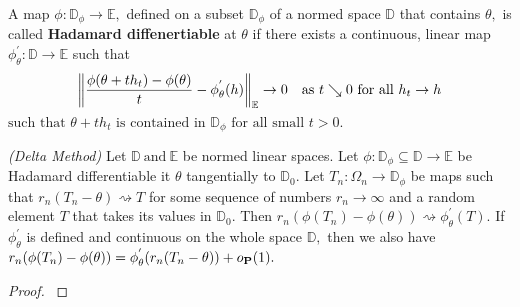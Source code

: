 \begin{definition}
  A map 
  $
  \phi:
  \mathbb{D}_\phi
  \to 
  \mathbb{E}
  ,
  $
  defined on a subset 
  $
  \mathbb{D}_\phi
  $
  of a normed space
  $\mathbb{D}$
  that contains 
  $\theta,$
  is called 
  \textbf{Hadamard diffenertiable}
  at $\theta$
  if there exists a continuous,
  linear map
  $
  \phi_\theta^{'}
    :
    \mathbb{D}
    \to 
    \mathbb{E}
  $
  such that
  \begin{gather}
    \norm{
      \frac{
        \phi(\theta + t h_t)
        -
        \phi(\theta)
      }{
        t
      }
      -
      \phi^{'}_\theta
      (h)
    }_\mathbb{E}
    \to
    0
    \quad
    \text{as}
    \ 
    t\searrow 0
    \ 
    \text{for all}
    \ 
    h_t \to h
  \end{gather}
  $
    \text{such that $\theta + th_t$ is contained in $\mathbb{D}_\phi$ for all small $t>0.$}
  $
\end{definition}


\begin{ftheorem}
  \emph{(Delta Method)}
  Let 
  $
    \mathbb{D}
    \ \text{and}
    \ 
    \mathbb{E}
  $
  be normed linear spaces.
  Let
  $
    \phi
    :
    \mathbb{D}_\phi
    \subseteq
    \mathbb{D}
    \to
    \mathbb{E}
  $
  be Hadamard differentiable it $\theta$
  tangentially to 
  $\mathbb{D}_0.$
  Let
  $
    T_n
    :
    \Omega_n
    \to
    \mathbb{D}_\phi
  $
  be maps such that 
  $
    r_n
    (T_n - \theta)
    \rightsquigarrow
    T
  $
  for some sequence of numbers $r_n \to \infty$
  and a random element $T$
  that takes its values in $\mathbb{D}_0.$
  Then 
  $
    r_n(\phi(T_n)-\phi(\theta))
    \rightsquigarrow
    \phi^{'}
    _\theta
    (T)
    .
  $
  If 
  $
    \phi^{'}
    _\theta
  $
  is defined and continuous on the whole space $\mathbb{D},$
  then we also have 
  $
    r_n
    (
      \phi(T_n)
      -
      \phi(\theta)
    )
    =
    \phi^{'}
    _\theta
    (
    r_n
    (
    T_n
    -
    \theta
    )
    )
    +
    o_\P
    (1)
    .
  $
\end{ftheorem}
\begin{proof}
  \cite[Theorem~20.8]{Vaart1998}
\end{proof}
